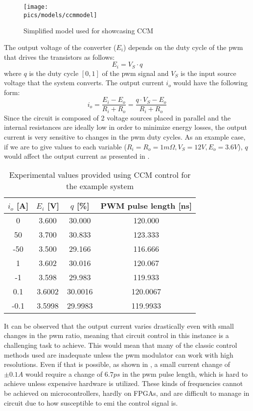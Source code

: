\begin{figure}[!ht]
    \begin{center}\texttt{[image: \\pics/models/ccmmodel]}\end{center}
    \caption{Simplified model used for showcasing CCM}
    \label{fig:ccmmodel}
\end{figure}

The output voltage of the converter ($E_i$) depends on the duty cycle of the \gls{pwm} that drives the transistors as follows:
\begin{equation}
E_i = V_S \cdot q
\end{equation}
where $q$ is the duty cycle $[0, 1]$ of the \gls{pwm} signal and $V_S$ is the input source voltage that the system converts.
The output current $i_o$ would have the following form:
\begin{equation}
i_o = \frac{E_i - E_o}{R_i + R_o} = \frac{q \cdot V_S - E_o}{R_i + R_o}  
\end{equation}
Since the circuit is composed of 2 voltage sources placed in parallel and the internal resistances are ideally low in order to minimize energy losses, the output current is very sensitive to changes in the \gls{pwm} duty cycles.
As an example case, if we are to give values to each variable ($R_i = R_o = 1m\Omega, V_S = 12V, E_o = 3.6V$), $q$ would affect the output current as presented in .

\begin{table}[ht!]
\begin{center}
\begin{tabular}{|c|c|c|c|}
\hline
$i_o$ [A]&$E_i$ [V]&$q$ [\%]&PWM pulse length [ns]\\ \hline
0&3.600&30.000&120.000\\ \hline
50&3.700&30.833&123.333\\ \hline
-50&3.500&29.166&116.666\\ \hline
1&3.602&30.016&120.067\\ \hline
-1&3.598&29.983&119.933\\ \hline
0.1&3.6002&30.0016&120.0067\\ \hline
-0.1&3.5998&29.9983&119.9933\\ \hline
\end{tabular}
\end{center}
\caption{Experimental values provided using CCM control for the example system}
\label{tab:ccmcur}
\end{table}

It can be observed that the output current varies drastically even with small changes in the \gls{pwm} ratio, meaning that circuit control in this instance is a challenging task to achieve.
This would mean that many of the classic control methods used are inadequate unless the \gls{pwm} modulator can work with high resolutions.
Even if that is possible, as shown in , a small current change of $\pm 0.1A$ would require a change of $6.7ps$ in the \gls{pwm} pulse length, which is hard to achieve unless expensive hardware is utilized.
These kinds of frequencies cannot be achieved on microcontrollers, hardly on FPGAs, and are difficult to manage in circuit due to how susceptible to \gls{emi} the control signal is.

